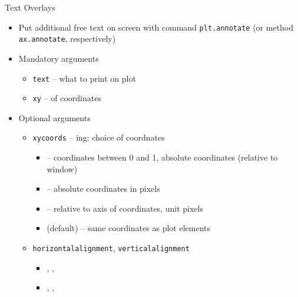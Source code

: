 \begin{frame}[fragile]{Text Overlays}
%
\begin{itemize}
\item Put additional free text on screen with command \texttt{plt.annotate} (or method \texttt{ax.annotate}, respectively)
\item Mandatory arguments
	\begin{itemize}
	\item \texttt{text} -- what to print on plot
	\item \texttt{xy} --  of coordinates
	\end{itemize}
\item Optional arguments
	\begin{itemize}
	\item \texttt{xycoords} -- ing: choice of coordnates
		\begin{itemize}
		\item {} -- coordinates between 0 and 1, absolute coordinates (relative to window)
		\item {} -- absolute coordinates in pixels
		\item {} -- relative to axis of coordinates, unit pixels
		\item {} (default) -- same coordinates as plot elements
		\end{itemize}
	\item \texttt{horizontalalignment}, \texttt{verticalalignment}
		\begin{itemize}
		\item {}, , 
		\item {}, , 
		\end{itemize}
	\end{itemize}
\end{itemize}
%
\end{frame}


